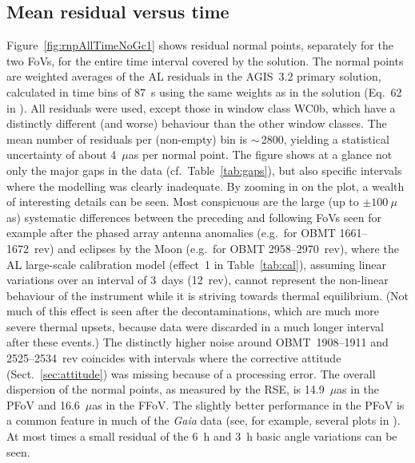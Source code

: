 \documentclass[longauth]{aa} %
\begin{document}
\subsection{Mean residual versus time}
\label{sec:residT} 
 
Figure~\ref{fig:rnpAllTimeNoGc1} shows residual normal points, separately for the two FoVs, 
for the entire time interval covered by the solution. The normal points are weighted averages of 
the AL residuals in the AGIS~3.2 primary solution, calculated in time bins of 87~s using the same 
weights as in the solution (Eq.~62 in ). All residuals were used, except
those in window class WC0b, which have a distinctly different (and worse) behaviour than the
other window classes. The mean number of residuals per (non-empty) bin is $\sim\,$2800, yielding a
statistical uncertainty of about 4~$\mu$as per normal point.
The figure shows at a glance not only the major gaps in the data (cf.\ Table~\ref{tab:gaps}), but also 
specific intervals where the modelling was clearly inadequate. By zooming in on the plot, a wealth of 
interesting details can be seen. Most conspicuous are the large (up to $\pm 100~\mu$as) systematic 
differences between the preceding and following FoVs seen for example after the phased array
antenna anomalies (e.g.\ for OBMT 1661--1672~rev) and eclipses by the Moon 
(e.g.\ for OBMT 2958--2970~rev),
where the AL large-scale calibration model (effect~1 in Table~\ref{tab:cal}), assuming linear variations
over an interval of 3~days (12~rev), cannot represent the non-linear behaviour of the instrument while
it is striving towards thermal equilibrium. (Not much of this effect is seen after the decontaminations, 
which are much more severe thermal upsets, because data were discarded in a much longer interval 
after these events.) The distinctly higher noise around OBMT~1908--1911 and 2525--2534~rev 
coincides
with intervals where the corrective attitude (Sect.~\ref{sec:attitude}) was missing because of a 
processing error. The overall dispersion of the normal points, as measured by the RSE,
is 14.9~$\mu$as in the PFoV and 16.6~$\mu$as in the FFoV. The
slightly better performance in the PFoV is a common feature in much of the
\textit{Gaia} data (see, for example, several plots in ). 
At most times a small residual of the 6~h and 3~h basic angle variations
can be seen.
\end{document}
